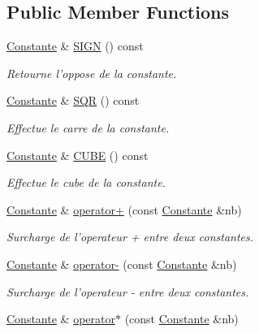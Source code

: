 \subsection*{\-Public \-Member \-Functions}
\begin{DoxyCompactItemize}
\item 
\hyperlink{class_l_o21_1_1_constante}{\-Constante} \& \hyperlink{class_l_o21_1_1_constante_a279a9cb03a7652957e5f20b2adc1f270}{\-S\-I\-G\-N} () const 
\begin{DoxyCompactList}\small\item\em \-Retourne l'oppose de la constante. \end{DoxyCompactList}\item 
\hyperlink{class_l_o21_1_1_constante}{\-Constante} \& \hyperlink{class_l_o21_1_1_constante_ab3581cf3213fb36e1c19d33e22f1e829}{\-S\-Q\-R} () const 
\begin{DoxyCompactList}\small\item\em \-Effectue le carre de la constante. \end{DoxyCompactList}\item 
\hyperlink{class_l_o21_1_1_constante}{\-Constante} \& \hyperlink{class_l_o21_1_1_constante_a6c1caa0adefa4eaf0429414840542531}{\-C\-U\-B\-E} () const 
\begin{DoxyCompactList}\small\item\em \-Effectue le cube de la constante. \end{DoxyCompactList}\item 
\hyperlink{class_l_o21_1_1_constante}{\-Constante} \& \hyperlink{class_l_o21_1_1_constante_a3e6291c03f657aa368671857b3ea9440}{operator+} (const \hyperlink{class_l_o21_1_1_constante}{\-Constante} \&nb)
\begin{DoxyCompactList}\small\item\em \-Surcharge de l'operateur + entre deux constantes. \end{DoxyCompactList}\item 
\hyperlink{class_l_o21_1_1_constante}{\-Constante} \& \hyperlink{class_l_o21_1_1_constante_a6e9af4e1804e4ef41bec14f155c83ff5}{operator-\/} (const \hyperlink{class_l_o21_1_1_constante}{\-Constante} \&nb)
\begin{DoxyCompactList}\small\item\em \-Surcharge de l'operateur -\/ entre deux constantes. \end{DoxyCompactList}\item 
\hyperlink{class_l_o21_1_1_constante}{\-Constante} \& \hyperlink{class_l_o21_1_1_constante_ae88587bdfaebe7beb505cea25df2655b}{operator$\ast$} (const \hyperlink{class_l_o21_1_1_constante}{\-Constante} \&nb)

\end{DoxyCompactItemize}
